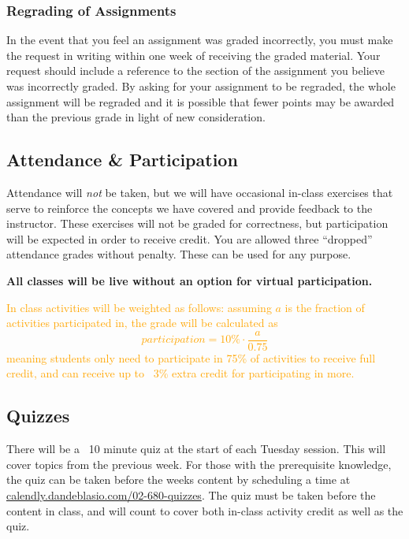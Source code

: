 \documentclass[12pt]{scrartcl}
\newcommand{\change}[2]{\textcolor{orange}{#2}}
\begin{document}
\subsubsection{Regrading of Assignments}
In the event that you feel an assignment was graded incorrectly, 
you must make the request in writing within one week of receiving the graded material.  
Your request should include a reference to the section of the assignment you believe was incorrectly graded.   
By asking for your assignment to be regraded, 
the whole assignment will be regraded and it is possible that fewer points 
may be awarded than the previous grade in light of new consideration.

\subsection{Attendance \& Participation}
Attendance will \emph{not} be taken, 
but we will have occasional in-class exercises that serve to reinforce the concepts we have covered and provide feedback to the instructor. 
These exercises will not be graded for correctness, but participation will be expected in order to receive credit.
You are allowed three ``dropped'' attendance grades without penalty. 
These can be used for any purpose. 

\textbf{All classes will be live without an option for virtual participation.}

\change{}{In class activities will be weighted as follows: assuming $a$ is the fraction of activities participated in, 
the grade will be calculated as \[participation = 10\% \cdot \frac{a}{0.75}\] meaning students only need to participate in 75\% of activities to receive full credit, and can receive up to ~3\% extra credit for participating in more. }

\subsection{Quizzes}
There will be a ~10 minute quiz at the start of each Tuesday session. 
This will cover topics from the previous week. 
For those with the prerequisite knowledge, the quiz can be taken before the weeks content
by scheduling a time at \url{calendly.dandeblasio.com/02-680-quizzes}.
The quiz must be taken before the content in class, and will count to cover both in-class activity credit as well as the quiz. 
\end{document}
